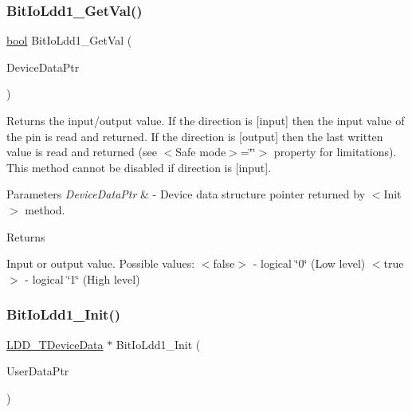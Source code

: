 \subsubsection{\texorpdfstring{Bit\+Io\+Ldd1\+\_\+\+Get\+Val()}{BitIoLdd1\_GetVal()}}
{\footnotesize\ttfamily \hyperlink{group___p_e___types__module_ga97a80ca1602ebf2303258971a2c938e2}{bool} Bit\+Io\+Ldd1\+\_\+\+Get\+Val (\begin{DoxyParamCaption}\item[{\hyperlink{group___p_e___types__module_gac5cf1362f1f0e3a2ce71b1bf2276d091}{L\+D\+D\+\_\+\+T\+Device\+Data} $\ast$}]{Device\+Data\+Ptr }\end{DoxyParamCaption})}



Returns the input/output value. If the direction is \mbox{[}input\mbox{]} then the input value of the pin is read and returned. If the direction is \mbox{[}output\mbox{]} then the last written value is read and returned (see $<$\+Safe mode$>$=\char`\"{}\char`\"{}$>$ property for limitations). This method cannot be disabled if direction is \mbox{[}input\mbox{]}. 


\begin{DoxyParams}{Parameters}
{\em Device\+Data\+Ptr} & -\/ Device data structure pointer returned by $<$\+Init$>$ method. \\
\hline
\end{DoxyParams}
\begin{DoxyReturn}{Returns}

\begin{DoxyItemize}
\item Input or output value. Possible values\+: $<$false$>$ -\/ logical \char`\"{}0\char`\"{} (Low level) $<$true$>$ -\/ logical \char`\"{}1\char`\"{} (High level) 
\end{DoxyItemize}
\end{DoxyReturn}
\mbox{\label{group___bit_io_ldd1__module_gadb85449174dc263f061e143166eb86c5}} 
\subsubsection{\texorpdfstring{Bit\+Io\+Ldd1\+\_\+\+Init()}{BitIoLdd1\_Init()}}
{\footnotesize\ttfamily \hyperlink{group___p_e___types__module_gac5cf1362f1f0e3a2ce71b1bf2276d091}{L\+D\+D\+\_\+\+T\+Device\+Data} $\ast$ Bit\+Io\+Ldd1\+\_\+\+Init (\begin{DoxyParamCaption}\item[{\hyperlink{group___p_e___types__module_ga0b66a73f87238a782318aa0be7578e35}{L\+D\+D\+\_\+\+T\+User\+Data} $\ast$}]{User\+Data\+Ptr }\end{DoxyParamCaption})}



